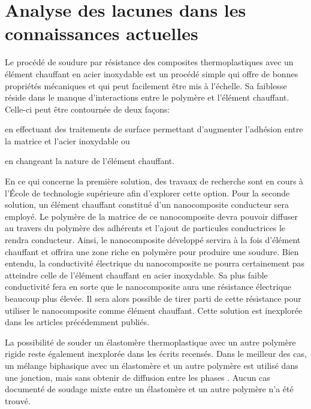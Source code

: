 \label{sec:Objectifs}

\section{Analyse des lacunes dans les connaissances actuelles}

Le procédé de soudure par résistance des composites thermoplastiques avec un élément chauffant en acier inoxydable est un procédé simple qui offre de bonnes propriétés mécaniques et qui peut facilement être mis à l'échelle. 
Sa faiblesse réside dans le manque d'interactions entre le polymère et l'élément chauffant. 
Celle-ci peut être contournée de deux façons: \begin{inparaenum}[a)]
	\item en effectuant des traitements de surface permettant d'augmenter l'adhésion entre la matrice et l'acier inoxydable ou 
	\item en changeant la nature de l'élément chauffant. 
\end{inparaenum}
En ce qui concerne la première solution, des travaux de recherche sont en cours à l'École de technologie supérieure afin d'explorer cette option. 
Pour la seconde solution, un élément chauffant constitué d'un nanocomposite conducteur sera employé. 
Le polymère de la matrice de ce nanocomposite devra pouvoir diffuser au travers du polymère des adhérents et l'ajout de particules conductrices le rendra conducteur. 
Ainsi, le nanocomposite développé servira à la fois d'élément chauffant et offrira une zone riche en polymère pour produire une soudure. 
Bien entendu, la conductivité électrique du nanocomposite ne pourra certainement pas atteindre celle de l'élément chauffant en acier inoxydable. 
Sa plus faible conductivité fera en sorte que le nanocomposite aura une résistance électrique beaucoup plus élevée. 
Il sera alors possible de tirer parti de cette résistance pour utiliser le nanocomposite comme élément chauffant. 
Cette solution est inexplorée dans les articles précédemment publiés. 

La possibilité de souder un élastomère thermoplastique avec un autre polymère rigide reste également inexplorée dans les écrits recensés. 
Dans le meilleur des cas, un mélange biphasique avec un élastomère et un autre polymère est utilisé dans une jonction, mais sans obtenir de diffusion entre les phases \cite{Hollande1998}. 
Aucun cas documenté de soudage mixte entre un élastomère et un autre polymère n'a été trouvé. 

